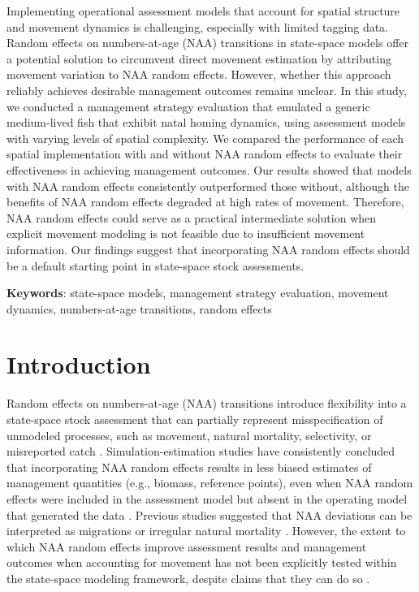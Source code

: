 \documentclass[
  12pt,
]{article}
\begin{document}
Implementing operational assessment models that account for spatial
structure and movement dynamics is challenging, especially with limited
tagging data. Random effects on numbers-at-age (NAA) transitions in
state-space models offer a potential solution to circumvent direct
movement estimation by attributing movement variation to NAA random
effects. However, whether this approach reliably achieves desirable
management outcomes remains unclear. In this study, we conducted a
management strategy evaluation that emulated a generic medium-lived fish
that exhibit natal homing dynamics, using assessment models with varying
levels of spatial complexity. We compared the performance of each
spatial implementation with and without NAA random effects to evaluate
their effectiveness in achieving management outcomes. Our results showed
that models with NAA random effects consistently outperformed those
without, although the benefits of NAA random effects degraded at high
rates of movement. Therefore, NAA random effects could serve as a
practical intermediate solution when explicit movement modeling is not
feasible due to insufficient movement information. Our findings suggest
that incorporating NAA random effects should be a default starting point
in state-space stock assessments.

\textbf{Keywords}: state-space models, management strategy evaluation,
movement dynamics, numbers-at-age transitions, random effects

\pagebreak

\hypertarget{introduction}{%
\section{Introduction}\label{introduction}}

Random effects on numbers-at-age (NAA) transitions introduce flexibility
into a state-space stock assessment that can partially represent
misspecification of unmodeled processes, such as movement, natural
mortality, selectivity, or misreported catch
\citep{Nielsen2014, Cadigan2016, Albertsen2018, Perretti2020, Stock2021a, Stock2021b}.
Simulation-estimation studies have consistently concluded that
incorporating NAA random effects results in less biased estimates of
management quantities (e.g., biomass, reference points), even when NAA
random effects were included in the assessment model but absent in the
operating model that generated the data \citep{Li2024}. Previous studies
suggested that NAA deviations can be interpreted as migrations or
irregular natural mortality \citep{Frisk2010, Gudmundsson2012}. However,
the extent to which NAA random effects improve assessment results and
management outcomes when accounting for movement has not been explicitly
tested within the state-space modeling framework, despite claims that
they can do so \citep{Gudmundsson2012, Nielsen2014, Stock2021a}.
\end{document}
